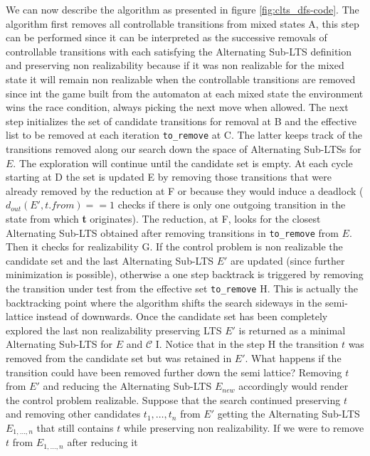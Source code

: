 We can now describe the algorithm as
presented in figure \ref{fig:clts_dfs-code}. The algorithm first removes all controllable transitions from
mixed states A, this step can be performed since it
can be interpreted as the successive removals of controllable 
transitions with each satisfying the Alternating Sub-LTS definition 
and preserving non realizability because if it was non realizable
for the mixed state it will remain non realizable when the controllable transitions are removed since int the game built from
the automaton at each mixed state the environment
wins the race condition, always picking the next move when allowed.
The next step initializes the set of 
candidate transitions
for removal at B and the effective list
to be removed at each iteration \texttt{to\_remove} at
C.  The latter keeps track of the transitions
removed along our search down the space of
Alternating Sub-LTSs for $E$.  The exploration
will continue until the candidate set is empty.
At each cycle starting at D the set is updated E by 
removing those transitions that were already removed by the reduction
at F or because they would induce a deadlock 
($d_{out}(E', t.from) == 1$ checks if there is only one
outgoing transition in the state from which \textbf{t} originates).
The
reduction, at F, looks for the closest
Alternating Sub-LTS obtained after removing 
transitions in \texttt{to\_remove} from $E$.
Then it checks for realizability G.  If the control problem is non
realizable the candidate set and the last 
Alternating Sub-LTS $E'$ are updated (since further minimization is 
possible), otherwise a one step backtrack
is triggered by removing the transition under test from
the effective set \texttt{to\_remove} H.
This is actually the backtracking point where the algorithm
shifts the search sideways in the semi-lattice instead of downwards.
Once the candidate set has been completely explored
the last non realizability preserving LTS $E'$ is
returned as a minimal Alternating Sub-LTS
for $E$ and $\mathcal{C}$ I.
Notice that
in the step H the transition $t$ was removed
from the candidate set but was retained in $E'$.  What happens if
the transition could have been removed further down the semi lattice?  Removing $t$ from $E'$ and reducing the Alternating Sub-LTS 
$E_{new}$ accordingly would render the control problem realizable.  Suppose that
the search continued preserving $t$ and removing other candidates
$t_1, \ldots, t_n$ from $E'$ getting the Alternating Sub-LTS
$E_{1,\ldots,n}$ that still contains $t$ while preserving non realizability.
If we were to remove $t$ from $E_{1,\ldots,n}$ after reducing it
